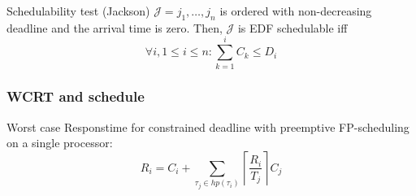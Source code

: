 \begin{definitionblock}{Schedulability test (Jackson)}
   $\mathcal{J} = {j_1,\ldots,j_n}$ is ordered with non-decreasing deadline and the arrival time is zero. Then, $\mathcal{J}$ is EDF schedulable iff
  \begin{equation*}
    \forall i, 1\leq i\leq n: \sum_{k=1}^{i} C_k\leq D_i
  \end{equation*}
\end{definitionblock}


\subsubsection{WCRT and schedule}
Worst case Responstime for constrained deadline with preemptive FP-scheduling on a single processor:
\begin{equation}
  R_i = C_i + \sum_{\tau_j \in hp(\tau_i)} \left\lceil\frac{R_i}{T_j}\right\rceil C_j
\end{equation}

